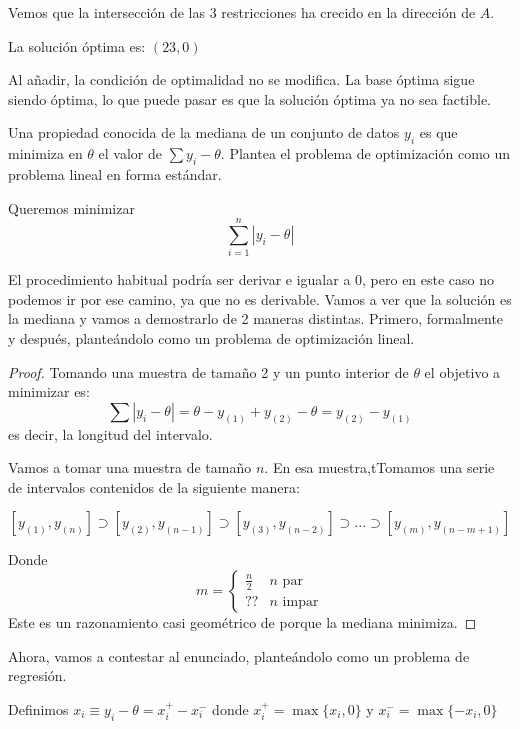 \begin{problem}[5]
Vemos que la intersección de las 3 restricciones ha crecido en la dirección de $A$.

La solución óptima es: $\left(23,0\right)$


\obs Al añadir, la condición de optimalidad no se modifica. La base óptima sigue siendo óptima, lo que puede pasar es que la solución óptima ya no sea factible.

\end{problem}


\begin{problem}[9]

Una propiedad conocida de la mediana de un conjunto de datos $y_i$ es que minimiza en $\theta$ el valor de $\sum y_i-\theta$. Plantea el problema de optimización como un problema lineal en forma estándar.
\solution

Queremos minimizar
\[\sum_{i=1}^n |y_i - \theta|\]

El procedimiento habitual podría ser derivar e igualar a 0, pero en este caso no podemos ir por ese camino, ya que no es derivable.
Vamos a ver que la solución es la mediana y vamos a demostrarlo de 2 maneras distintas.
Primero, formalmente y después, planteándolo como un problema de optimización lineal.

\begin{proof}

Tomando una muestra de tamaño 2 y un punto interior de $\theta$ el objetivo a minimizar es:
\[\sum |y_i - \theta| = \theta - y_{(1)} + y_{(2)}-\theta = y_{(2)} - y_{(1)}\]
es decir, la longitud del intervalo.

Vamos a tomar una muestra de tamaño $n$.
En esa muestra,tTomamos una serie de intervalos contenidos de la siguiente manera:

\[ [y_{(1)},y_{(n)}] \supset  [y_{(2)},y_{(n-1)}] \supset [y_{(3)},y_{(n-2)}] \supset ... \supset [y_{(m)},y_{(n-m+1)}]\]

Donde \[m=\left\{ \begin{array}{cc} \frac{n}{2} & n\text{ par}\\ ?? & n\text{ impar} \end{array}\right.\]
Este es un razonamiento casi geométrico de porque la mediana minimiza.
\end{proof}


Ahora, vamos a contestar al enunciado, planteándolo como un problema de regresión.

Definimos $x_i \equiv y_i - \theta = x_i^+ - x_i^-$ donde $x_i^+ = \max\{x_i,0\}$ y $x_i^- = \max\{-x_i,0\}$


\end{problem}
